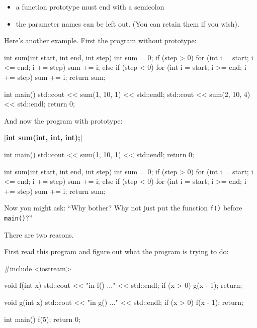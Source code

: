 \begin{itemize}
\item a function prototype must end with a semicolon
\item the parameter names can be left out. (You can retain them if you wish).
\end{itemize}

Here's another example. First the program without prototype:

\begin{consolethree}[escapeinside=||]
int sum(int start, int end, int step)
{
    int sum = 0;
    if (step > 0)
    {
        for (int i = start; i <= end; i += step)
        {
            sum += i;
        }
    }
    else if (step < 0)
    {
        for (int i = start; i >= end; i += step)
        {
            sum += i;
        }
    }
    return sum;
}

int main()
{
    std::cout << sum(1, 10, 1) << std::endl;
    std::cout << sum(2, 10, 4) << std::endl;
    return 0;
}
\end{consolethree}

And now the program with prototype:

\begin{consolethree}[escapeinside=||]
|\textbf{int sum(int, int, int);}|

int main()
{
    std::cout << sum(1, 10, 1) << std::endl;
    return 0;
}

int sum(int start, int end, int step)
{
    int sum = 0;
    if (step > 0)
    {
        for (int i = start; i <= end; i += step)
        {
            sum += i;
        }
    }
    else if (step < 0)
    {
        for (int i = start; i >= end; i += step)
        {
            sum += i;
        }
    }
    return sum;
}
\end{consolethree}




Now you might ask: ``Why bother? Why not just put the function
\texttt{f()} before \texttt{main()}?''

There are two reasons.

First read this program and figure out what the program is trying to do:

\begin{consolethree}[escapeinside=||]
#include <iostream>

void f(int x)
{
    std::cout << "in f() ..." << std::endl;
    if (x > 0) g(x - 1);
    return;
}

void g(int x)
{
    std::cout << "in g() ..." << std::endl;
    if (x > 0) f(x - 1);
    return;
}

int main()
{
    f(5);
    return 0;
}
\end{consolethree}

